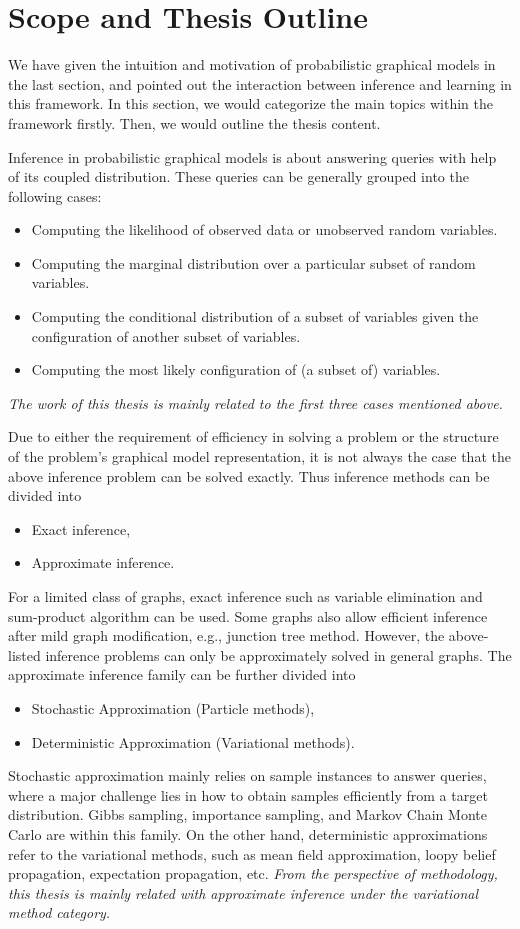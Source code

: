 \section{Scope and Thesis Outline}\label{chpt1:sec:scope-outline}
We have given the intuition and motivation of probabilistic graphical models in the last section, and pointed out the interaction between inference and learning in this framework. In this section, we would categorize the main topics within the framework firstly. Then, we would outline the thesis content.

Inference in probabilistic graphical models is about answering queries with help of its coupled distribution. These queries can be generally grouped into the following cases:
\begin{itemize}
\item Computing the likelihood of observed data or unobserved random variables.
\item Computing the marginal distribution over a particular subset of random variables.
\item Computing the conditional distribution of a subset of variables given the configuration of another subset of variables. 
\item Computing the most likely configuration of (a subset of) variables.
\end{itemize}
\textit{The work of this thesis is mainly related to the first three cases mentioned above.}


Due to either the requirement of efficiency in solving a problem or the structure of the problem's graphical model representation, it is not always the case that the above inference problem can be solved exactly. Thus inference methods can be divided into
\begin{itemize}
\item Exact inference,
\item Approximate inference.
\end{itemize}
For a limited class of graphs, exact inference such as variable elimination and sum-product algorithm can be used. Some graphs also allow efficient inference after mild graph modification, e.g., junction tree method. However, the above-listed inference problems can only be approximately solved in general graphs. The approximate inference family can be further divided into
\begin{itemize}
\item Stochastic Approximation (Particle methods),
\item Deterministic Approximation (Variational methods).
\end{itemize}
Stochastic approximation mainly relies on sample instances to answer queries, where a major challenge lies in how to obtain samples efficiently from a target distribution. Gibbs sampling, importance sampling, and Markov Chain Monte Carlo are within this family. On the other hand, deterministic approximations refer to the variational methods, such as mean field approximation, loopy belief propagation, expectation propagation, etc. \textit{From the perspective of methodology, this thesis is mainly related with approximate inference under the variational method category.}


